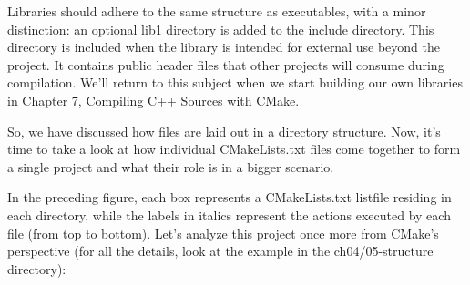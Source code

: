 
Libraries should adhere to the same structure as executables, with a minor distinction: an optional lib1 directory is added to the include directory. This directory is included when the library is intended for external use beyond the project. It contains public header files that other projects will consume during compilation. We’ll return to this subject when we start building our own libraries in Chapter 7, Compiling C++ Sources with CMake.

So, we have discussed how files are laid out in a directory structure. Now, it’s time to take a look at how individual CMakeLists.txt files come together to form a single project and what their role is in a bigger scenario.


In the preceding figure, each box represents a CMakeLists.txt listfile residing in each directory, while the labels in italics represent the actions executed by each file (from top to bottom). Let’s analyze this project once more from CMake’s perspective (for all the details, look at the example in the ch04/05-structure directory):

